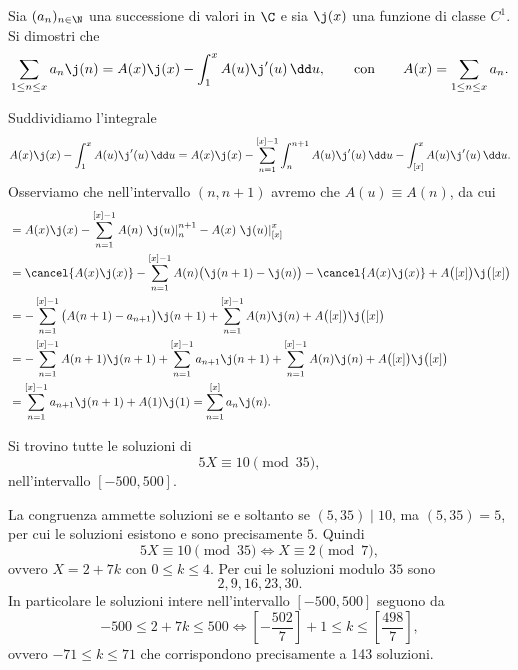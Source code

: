 \setcounter{exeN}{0}

\begin{exeN}\label{ex:2.1}
	Sia \((a_n)_{n\in\N}\) una successione di valori in \(\C\) e sia \(\j(x)\) una funzione di classe \(C^1\).
	Si dimostri che
	\[
		\sum_{1 \le n \le x}a_n \j(n) = A(x)\j(x)-\int_1^x A(u)\j'(u)\,\dd u,\qquad\text{con}\qquad A(x)=\sum_{1\le n\le x}a_n.
	\]
\end{exeN}

\begin{sol}
	Suddividiamo l'integrale
	\[
		A(x)\j(x)-\int_1^x A(u)\j'(u)\,\dd u = A(x)\j(x) - \sum_{n=1}^{[x]-1}\int_n^{n+1}A(u)\j'(u)\,\dd u-\int_{[x]}^x A(u)\j'(u)\,\dd u.
	\]
	Osserviamo che nell'intervallo \((n,n+1)\) avremo che \(A(u)\equiv A(n)\), da cui
	\[
		\begin{split}
			& = A(x)\j(x) - \sum_{n=1}^{[x]-1}A(n)\left.\j(u)\right|_n^{n+1} - A(x)\left.\j(u)\right|_{[x]}^x\\
			& = \cancel{A(x)\j(x)}-\sum_{n=1}^{[x]-1}A(n)\big(\j(n+1)-\j(n)\big)-\cancel{A(x)\j(x)}+A\big([x]\big)\j\big([x]\big)\\
			& = -\sum_{n=1}^{[x]-1} \big(A(n+1)-a_{n+1}\big)\j(n+1) + \sum_{n=1}^{[x]-1}A(n)\j(n)+A\big([x]\big)\j\big([x]\big)\\
			& = -\sum_{n=1}^{[x]-1}A(n+1)\j(n+1)+\sum_{n=1}^{[x]-1}a_{n+1}\j(n+1)+\sum_{n=1}^{[x]-1}A(n)\j(n)+A\big([x]\big)\j\big([x]\big)\\
			& = \sum_{n=1}^{[x]-1}a_{n+1}\j(n+1)+A(1)\j(1)=\sum_{n=1}^{[x]}a_n\j(n).
		\end{split}
	\]
\end{sol}

\begin{exeN}\label{ex:2.2}
	Si trovino tutte le soluzioni di
	\[
		5X\equiv 10 \pmod{35},
	\]
	nell'intervallo \([-500,500]\).
\end{exeN}

\begin{sol}
	La congruenza ammette soluzioni se e soltanto se \((5,35)\mid 10\), ma \((5,35)=5\), per cui le soluzioni esistono e sono precisamente \(5\).
	Quindi
	\[
		5X \equiv 10 \pmod{35} \iff X \equiv 2 \pmod{7},
	\]
	ovvero \(X = 2+7k\) con \(0\le k\le 4\).
	Per cui le soluzioni modulo \(35\) sono
	\[
		2,9,16,23,30.
	\]
	In particolare le soluzioni intere nell'intervallo \([-500,500]\) seguono da
	\[
		-500 \le 2+7k \le 500 \iff \left[ -\frac{502}{7} \right] +1 \le k \le \left[ \frac{498}{7} \right],
	\]
	ovvero \(-71 \le k \le 71\) che corrispondono precisamente a 143 soluzioni.
\end{sol}

